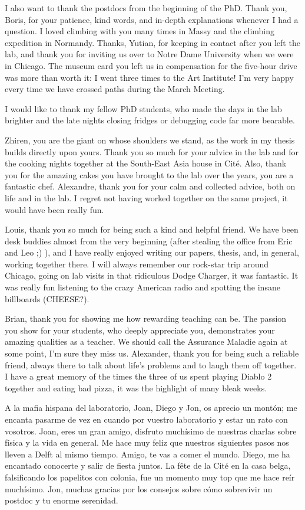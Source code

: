 I also want to thank the postdocs from the beginning of the PhD. Thank you, Boris, for your patience, kind words, and in-depth explanations whenever I had a question. I loved climbing with you many times in Massy and the climbing expedition in Normandy. Thanks, Yutian, for keeping in contact after you left the lab, and thank you for inviting us over to Notre Dame University when we were in Chicago. The museum card you left us in compensation for the five-hour drive was more than worth it: I went three times to the Art Institute! I'm very happy every time we have crossed paths during the March Meeting.

I would like to thank my fellow PhD students, who made the days in the lab brighter and the late nights closing fridges or debugging code far more bearable.

Zhiren, you are the giant on whose shoulders we stand, as the work in my thesis builds directly upon yours. Thank you so much for your advice in the lab and for the cooking nights together at the South-East Asia house in Cité. Also, thank you for the amazing cakes you have brought to the lab over the years, you are a fantastic chef. Alexandre, thank you for your calm and collected advice, both on life and in the lab. I regret not having worked together on the same project, it would have been really fun.

Louis, thank you so much for being such a kind and helpful friend. We have been desk buddies almost from the very beginning (after stealing the office from Eric and Leo ;) ), and I have really enjoyed writing our papers, thesis, and, in general, working together there. I will always remember our rock-star trip around Chicago, going on lab visits in that ridiculous Dodge Charger, it was fantastic. It was really fun listening to the crazy American radio and spotting the insane billboards (CHEESE?).

Brian, thank you for showing me how rewarding teaching can be. The passion you show for your students, who deeply appreciate you, demonstrates your amazing qualities as a teacher. We should call the Assurance Maladie again at some point, I'm sure they miss us. Alexander, thank you for being such a reliable friend, always there to talk about life's problems and to laugh them off together. I have a great memory of the times the three of us spent playing Diablo 2 together and eating bad pizza, it was the highlight of many bleak weeks.

A la mafia hispana del laboratorio, Joan, Diego y Jon, os aprecio un montón; me encanta pasarme de vez en cuando por vuestro laboratorio y estar un rato con vosotros. Joan, eres un gran amigo, disfruto muchísimo de nuestras charlas sobre física y la vida en general. Me hace muy feliz que nuestros siguientes pasos nos lleven a Delft al mismo tiempo. Amigo, te vas a comer el mundo. Diego, me ha encantado conocerte y salir de fiesta juntos. La fête de la Cité en la casa belga, falsificando los papelitos con colonia, fue un momento muy top que me hace reír muchísimo. Jon, muchas gracias por los consejos sobre cómo sobrevivir un postdoc y tu enorme serenidad.

